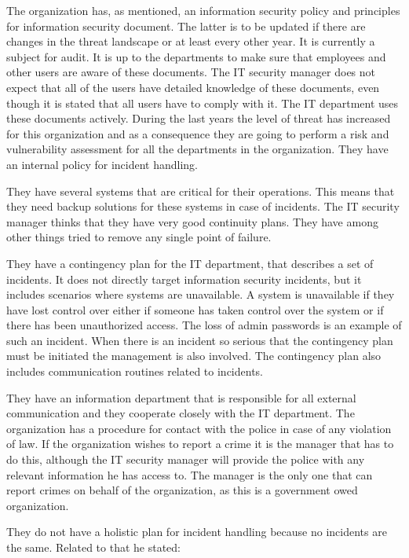 The organization has, as mentioned, an information security policy and principles for information security document. The latter is to be updated if there are changes in the threat landscape or at least every other year. It is currently a subject for audit. It is up to the departments to make sure that employees and other users are aware of these documents. The IT security manager does not expect that all of the users have detailed knowledge of these documents, even though it is stated that all users have to comply with it. The IT department uses these documents actively. %
During the last years the level of threat has increased for this organization and as a consequence they are going to perform a risk and vulnerability assessment for all the departments in the organization. They have an internal policy for incident handling.

They have several systems that are critical for their operations. This means that they need backup solutions for these systems in case of incidents. The IT security manager thinks that they have very good continuity plans. They have among other things tried to remove any single point of failure.

They have a contingency plan for the IT department, that describes a set of incidents. It does not directly target information security incidents, but it includes scenarios where systems are unavailable. A system is unavailable if they have lost control over either if someone has taken control over the system or if there has been unauthorized access. The loss of admin passwords is an example of such an incident. When there is an incident so serious that the contingency plan must be initiated the management is also involved. The contingency plan also includes communication routines related to incidents. 

They have an information department that is responsible for all external communication and they cooperate closely with the IT department. The organization has a procedure for contact with the police in case of any violation of law. If the organization wishes to report a crime it is the manager that has to do this, although the IT security manager will provide the police with any relevant information he has access to. The manager is the only one that can report crimes on behalf of the organization, as this is a government owed organization.

They do not have a holistic plan for incident handling because no incidents are the same. Related to that he stated:

